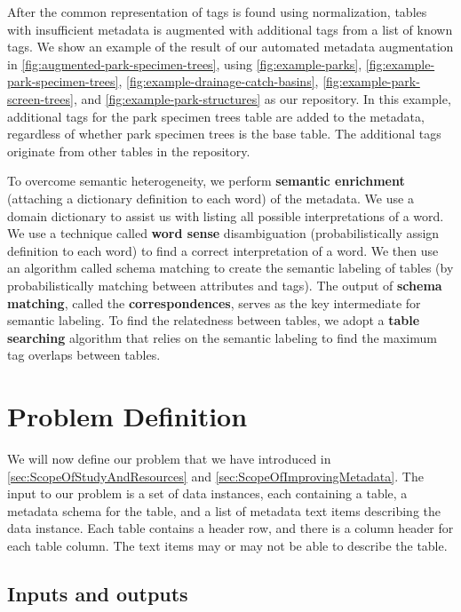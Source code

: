 After the common representation of tags is found using normalization, tables with insufficient metadata is augmented with additional tags from a list of known tags. We show an example of the result of our automated metadata augmentation in \autoref{fig:augmented-park-specimen-trees}, using \autoref{fig:example-parks}, \autoref{fig:example-park-specimen-trees}, \autoref{fig:example-drainage-catch-basins}, \autoref{fig:example-park-screen-trees}, and \autoref{fig:example-park-structures} as our repository. In this example, additional tags for the park specimen trees table are added to the metadata, regardless of whether park specimen trees is the base table. The additional tags originate from other tables in the repository.

To overcome semantic heterogeneity, we perform \textbf{\gls{semantic enrichment}} (attaching a dictionary definition to each word) of the metadata. We use a domain dictionary to assist us with listing all possible interpretations of a word. We use a technique called \textbf{\gls{word sense}} disambiguation (probabilistically assign definition to each word) to find a correct interpretation of a word. We then use an algorithm called schema matching to create the semantic labeling of tables (by probabilistically matching between attributes and tags). The output of \textbf{\gls{schema matching}}, called the \textbf{\glspl{correspondence}}, serves as the key intermediate for semantic labeling. To find the relatedness between tables, we adopt a \textbf{\gls{table searching}} algorithm that relies on the semantic labeling to find the maximum tag overlaps between tables.

\section{Problem Definition}
\label{sec:ProblemDefinition}

We will now define our problem that we have introduced in \autoref{sec:ScopeOfStudyAndResources} and \autoref{sec:ScopeOfImprovingMetadata}. The input to our problem is a set of data instances, each containing a table, a metadata schema for the table, and a list of metadata text items describing the data instance. Each table contains a header row, and there is a column header for each table column. The text items may or may not be able to describe the table.

\subsection{Inputs and outputs}

